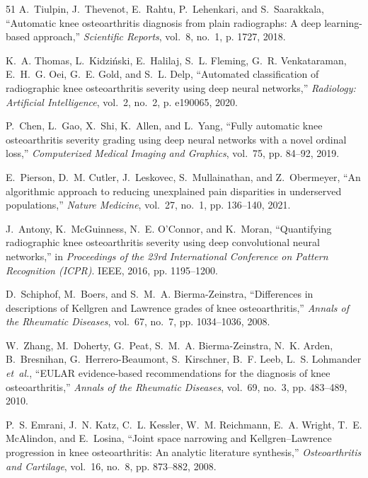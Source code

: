 \documentclass[10pt,journal]{IEEEtran}
\begin{document}
\begin{thebibliography}{51}
A.~Tiulpin, J.~Thevenot, E.~Rahtu, P.~Lehenkari, and S.~Saarakkala, ``Automatic knee osteoarthritis diagnosis from plain radiographs: A deep learning-based approach,'' \emph{Scientific Reports}, vol.~8, no.~1, p. 1727, 2018.

K.~A. Thomas, L.~Kidzi{\'n}ski, E.~Halilaj, S.~L. Fleming, G.~R. Venkataraman, E.~H.~G. Oei, G.~E. Gold, and S.~L. Delp, ``Automated classification of radiographic knee osteoarthritis severity using deep neural networks,'' \emph{Radiology: Artificial Intelligence}, vol.~2, no.~2, p. e190065, 2020.

P.~Chen, L.~Gao, X.~Shi, K.~Allen, and L.~Yang, ``Fully automatic knee osteoarthritis severity grading using deep neural networks with a novel ordinal loss,'' \emph{Computerized Medical Imaging and Graphics}, vol.~75, pp. 84--92, 2019.

E.~Pierson, D.~M. Cutler, J.~Leskovec, S.~Mullainathan, and Z.~Obermeyer, ``An algorithmic approach to reducing unexplained pain disparities in underserved populations,'' \emph{Nature Medicine}, vol.~27, no.~1, pp. 136--140, 2021.

J.~Antony, K.~McGuinness, N.~E. O'Connor, and K.~Moran, ``Quantifying radiographic knee osteoarthritis severity using deep convolutional neural networks,'' in \emph{Proceedings of the 23rd International Conference on Pattern Recognition (ICPR)}. IEEE, 2016, pp. 1195--1200.

D.~Schiphof, M.~Boers, and S.~M.~A. Bierma-Zeinstra, ``Differences in descriptions of Kellgren and Lawrence grades of knee osteoarthritis,'' \emph{Annals of the Rheumatic Diseases}, vol.~67, no.~7, pp. 1034--1036, 2008.

W.~Zhang, M.~Doherty, G.~Peat, S.~M.~A. Bierma-Zeinstra, N.~K. Arden, B.~Bresnihan, G.~Herrero-Beaumont, S.~Kirschner, B.~F. Leeb, L.~S. Lohmander \emph{et~al.}, ``EULAR evidence-based recommendations for the diagnosis of knee osteoarthritis,'' \emph{Annals of the Rheumatic Diseases}, vol.~69, no.~3, pp. 483--489, 2010.

P.~S. Emrani, J.~N. Katz, C.~L. Kessler, W.~M. Reichmann, E.~A. Wright, T.~E. McAlindon, and E.~Losina, ``Joint space narrowing and Kellgren--Lawrence progression in knee osteoarthritis: An analytic literature synthesis,'' \emph{Osteoarthritis and Cartilage}, vol.~16, no.~8, pp. 873--882, 2008.


\end{thebibliography}
\end{document}
